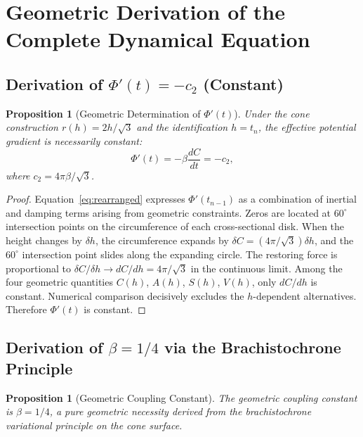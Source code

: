 \documentclass[12pt,a4paper]{article}
\newtheorem{proposition}[theorem]{Proposition}
\begin{document}
\section{Geometric Derivation of the Complete Dynamical Equation}
\label{sec:geometric}

\subsection{Derivation of $\Phi'(t) = -c_2$ (Constant)}

\begin{proposition}[Geometric Determination of $\Phi'(t)$]
\label{prop:constant}
Under the cone construction $r(h)=2h/\sqrt{3}$ and the identification $h=t_n$, the effective potential gradient is necessarily constant:
\begin{equation}
\Phi'(t) = -\beta\frac{dC}{dt} = -c_2,
\end{equation}
where $c_2 = 4\pi\beta/\sqrt{3}$.
\end{proposition}

\begin{proof}
Equation~\eqref{eq:rearranged} expresses $\Phi'(t_{n-1})$ as a combination of inertial and damping terms arising from geometric constraints. Zeros are located at $60^\circ$ intersection points on the circumference of each cross-sectional disk. When the height changes by $\delta h$, the circumference expands by $\delta C = (4\pi/\sqrt{3})\delta h$, and the $60^\circ$ intersection point slides along the expanding circle. The restoring force is proportional to $\delta C/\delta h \to dC/dh = 4\pi/\sqrt{3}$ in the continuous limit. Among the four geometric quantities $C(h)$, $A(h)$, $S(h)$, $V(h)$, only $dC/dh$ is constant. Numerical comparison decisively excludes the $h$-dependent alternatives. Therefore $\Phi'(t)$ is constant.
\end{proof}

\subsection{Derivation of $\beta = 1/4$ via the Brachistochrone Principle}

\begin{proposition}[Geometric Coupling Constant]
\label{prop:beta}
The geometric coupling constant is $\beta = 1/4$, a pure geometric necessity derived from the brachistochrone variational principle on the cone surface.
\end{proposition}
\end{document}
